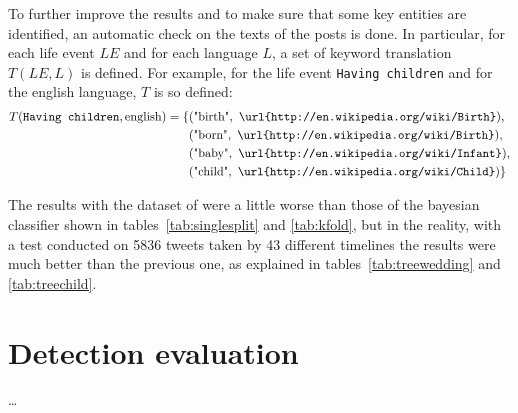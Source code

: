 To further improve the results and to make sure that some key entities are identified, an automatic check on the texts of the posts is done. In particular, for each life event $LE$ and for each language $L$, a set of keyword translation $T(LE, L)$ is defined. For example, for the life event \texttt{Having children} and for the english language, $T$ is so defined:
\begin{equation*}
\begin{split}
T(\text{\texttt{Having children}}, \text{english}) = \{&(\text{"birth"}, \text{ \texttt{\url{http://en.wikipedia.org/wiki/Birth}}}),\\&(\text{"born"}, \text{ \texttt{\url{http://en.wikipedia.org/wiki/Birth}}}),\\&(\text{"baby"}, \text{ \texttt{\url{http://en.wikipedia.org/wiki/Infant}}}),\\&(\text{"child"}, \text{ \texttt{\url{http://en.wikipedia.org/wiki/Child}}})\}
\end{split}
\end{equation*}

The results with the dataset of \cite{dickinson2015identifying} were a little worse than those of the bayesian classifier shown in tables~\ref{tab:singlesplit} and \ref{tab:kfold}, but in the reality, with a test conducted on 5836 tweets taken by 43 different timelines the results were much better than the previous one, as explained in tables~\ref{tab:treewedding} and \ref{tab:treechild}.

\begin{table}[htbp]
\centering
{}\qquad\qquad
{}
\caption{The performance of the decision tree with a very unbalanced dataset. On this same test set the previous classifier, the naive bayes, showed both precision and recall scores under 0.1.}
\end{table}

\section{Detection evaluation}
\label{sec:detectioneva}
\dots